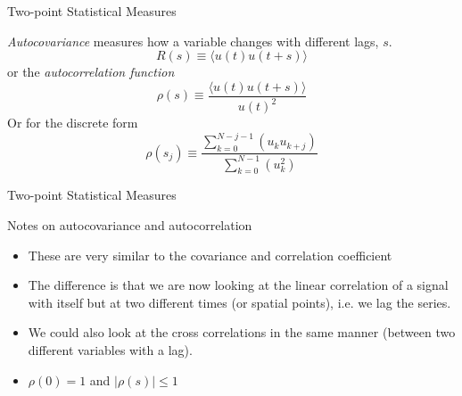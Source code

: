 
\begin{frame}{Two-point Statistical Measures}
  
  \textit{Autocovariance} measures how a variable changes with different lags, $s$.
  $$R(s) \equiv \langle u(t) u(t+s)\rangle$$
  or the \textit{autocorrelation function}
  $$\rho(s) \equiv \frac{ \langle u(t)u(t+s)\rangle}{u(t)^2}$$
  Or for the discrete form
  $$\rho(s_j) \equiv \frac{ \sum^{N-j-1}_{k=0}(u_ku_{k+j})}{\sum^{N-1}_{k=0}(u_k^2)}$$
  
\end{frame}


\begin{frame}{Two-point Statistical Measures}
  
  Notes on autocovariance and autocorrelation
  \begin{itemize}
  	\item These are very similar to the covariance and correlation coefficient
  	\item The difference is that we are now looking at the linear correlation of a signal with itself but at two different times (or spatial points), i.e. we lag the series.
  	\item We could also look at the cross correlations in the same manner (between two different variables with a lag).
  	\item $\rho(0) = 1$ and $|\rho(s)| \leq 1$
  \end{itemize}
  
\end{frame}

